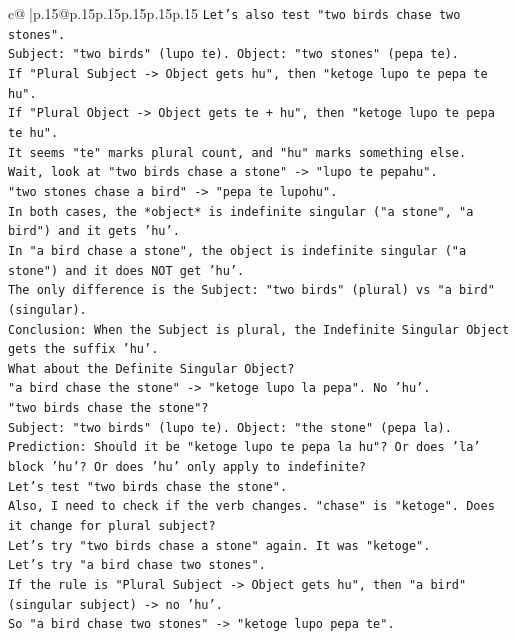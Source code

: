 \documentclass{article}
\begin{document}
{\begin{supertabular}{c@{$\;$}|p{.15\linewidth}@{}p{.15\linewidth}p{.15\linewidth}p{.15\linewidth}p{.15\linewidth}p{.15\linewidth}}
{{{\texttt{Let's also test "two birds chase two stones".} \\
\texttt{Subject: "two birds" (lupo te). Object: "two stones" (pepa te).} \\
\texttt{If "Plural Subject {-}> Object gets hu", then "ketoge lupo te pepa te hu".} \\
\texttt{If "Plural Object {-}> Object gets te + hu", then "ketoge lupo te pepa te hu".} \\
\texttt{It seems "te" marks plural count, and "hu" marks something else.} \\
\texttt{Wait, look at "two birds chase a stone" {-}> "lupo te pepahu".} \\
\texttt{"two stones chase a bird" {-}> "pepa te lupohu".} \\
\texttt{In both cases, the *object* is indefinite singular ("a stone", "a bird") and it gets 'hu'.} \\
\texttt{In "a bird chase a stone", the object is indefinite singular ("a stone") and it does NOT get 'hu'.} \\
\texttt{The only difference is the Subject: "two birds" (plural) vs "a bird" (singular).} \\
\texttt{Conclusion: When the Subject is plural, the Indefinite Singular Object gets the suffix 'hu'.} \\
\texttt{What about the Definite Singular Object?} \\
\texttt{"a bird chase the stone" {-}> "ketoge lupo la pepa". No 'hu'.} \\
\texttt{"two birds chase the stone"?} \\
\texttt{Subject: "two birds" (lupo te). Object: "the stone" (pepa la).} \\
\texttt{Prediction: Should it be "ketoge lupo te pepa la hu"? Or does 'la' block 'hu'? Or does 'hu' only apply to indefinite?} \\
\texttt{Let's test "two birds chase the stone".} \\
\texttt{Also, I need to check if the verb changes. "chase" is "ketoge". Does it change for plural subject?} \\
\texttt{Let's try "two birds chase a stone" again. It was "ketoge".} \\
\texttt{Let's try "a bird chase two stones".} \\
\texttt{If the rule is "Plural Subject {-}> Object gets hu", then "a bird" (singular subject) {-}> no 'hu'.} \\
\texttt{So "a bird chase two stones" {-}> "ketoge lupo pepa te".} \\
}}}
\end{supertabular}}
\end{document}
